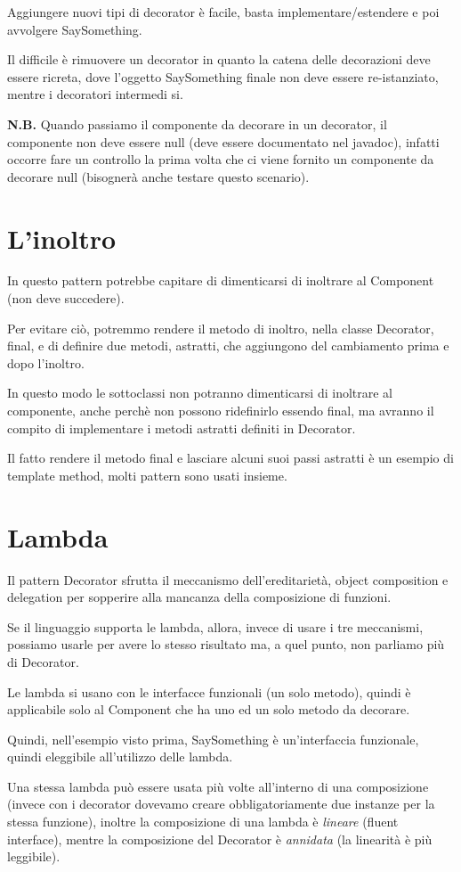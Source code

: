 Aggiungere nuovi tipi di decorator è facile, basta implementare/estendere e poi avvolgere SaySomething.

Il difficile è rimuovere un decorator in quanto la catena delle decorazioni deve essere ricreta, dove l'oggetto SaySomething finale non deve essere re-istanziato, 
mentre i decoratori intermedi si.

\medskip
\textbf{N.B.} Quando passiamo il componente da decorare in un decorator, il componente non deve essere null (deve essere documentato nel javadoc), infatti occorre 
fare un controllo la prima volta che ci viene fornito un componente da decorare null (bisognerà anche testare questo scenario).

\section{L'inoltro}

In questo pattern potrebbe capitare di dimenticarsi di inoltrare al Component (non deve succedere).

Per evitare ciò, potremmo rendere il metodo di inoltro, nella classe Decorator, final, e di definire due metodi, astratti, che aggiungono del cambiamento prima e dopo 
l'inoltro.

In questo modo le sottoclassi non potranno dimenticarsi di inoltrare al componente, anche perchè non possono ridefinirlo essendo final, ma avranno il compito di 
implementare i metodi astratti definiti in Decorator.

Il fatto rendere il metodo final e lasciare alcuni suoi passi astratti è un esempio di template method, molti pattern sono usati insieme.

\section{Lambda}

Il pattern Decorator sfrutta il meccanismo dell'ereditarietà, object composition e delegation per sopperire alla mancanza della composizione di funzioni.

Se il linguaggio supporta le lambda, allora, invece di usare i tre meccanismi, possiamo usarle per avere lo stesso risultato ma, a quel punto, non parliamo più di 
Decorator.

Le lambda si usano con le interfacce funzionali (un solo metodo), quindi è applicabile solo al Component che ha uno ed un solo metodo da decorare.

Quindi, nell'esempio visto prima, SaySomething è un'interfaccia funzionale, quindi eleggibile all'utilizzo delle lambda.

Una stessa lambda può essere usata più volte all'interno di una composizione (invece con i decorator dovevamo creare obbligatoriamente due instanze per la stessa 
funzione), inoltre la composizione di una lambda è \textit{lineare} (fluent interface), mentre la composizione del Decorator è \textit{annidata} (la linearità è 
più leggibile).